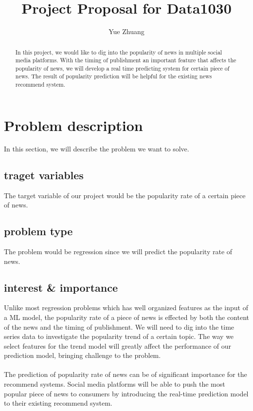 \documentclass[10pt]{article}
\begin{document}
\title{Project Proposal for Data1030}
\author{Yue Zhuang}

\maketitle

\begin{abstract}
In this project, we would like to dig into the popularity of news in multiple 
social media platforms. With the timing of publishment an important feature 
that affects the popularity of news, we will develop a real time predicting 
system for certain piece of news. The result of popularity prediction will 
be helpful for the existing news recommend system.
\end{abstract}

\section{Problem description}
In this section, we will describe the problem we want to solve.
\subsection{traget variables}
The target variable of our project would be the popularity rate of a certain 
piece of news.
\subsection{problem type}
The problem would be regression since we will predict the popularity rate of news.
\subsection{interest \& importance}
Unlike most regression problems which has well organized features as the input 
of a ML model, the popularity rate of a piece of news is effected by both the 
content of the news and the timing of publishment. We will need to dig into the 
time series data to investigate the popularity trend of a certain topic. The way 
we select features for the trend model will greatly affect the performance of 
our prediction model, bringing challenge to the problem.
\\\\
The prediction of popularity rate of news can be of significant importance for the 
recommend systems. Social media platforms will be able to push the most popular 
piece of news to consumers by introducing the real-time prediction model to their 
existing recommend system. 
\end{document}
